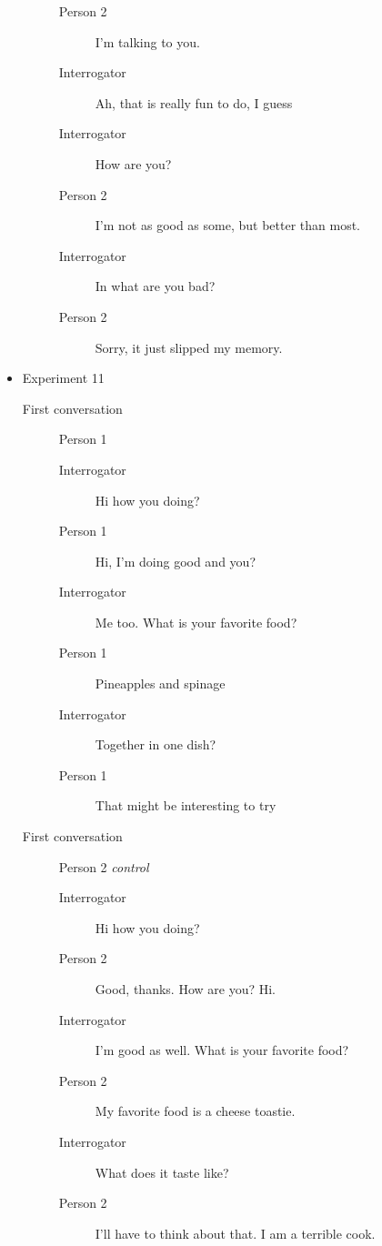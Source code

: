 \begin{itemize}
\begin{description}
\begin{description}
               \item [Person 2] I'm talking to you.
               \item [Interrogator] Ah, that is really fun to do, I guess
               \item [Interrogator] How are you?
               \item [Person 2] I'm not as good as some, but better than most.
               \item [Interrogator] In what are you bad?
               \item [Person 2] Sorry, it just slipped my memory.
            \end{description}
      \end{description}

   \item Experiment 11
      \begin{description}
         \item [First conversation] Person 1
            \begin{description}
               \item [Interrogator] Hi how you doing?
               \item [Person 1] Hi, I'm doing good and you?
               \item [Interrogator] Me too. What is your favorite food?
               \item [Person 1] Pineapples and spinage
               \item [Interrogator] Together in one dish?
               \item [Person 1] That might be interesting to try
            \end{description}
         \item [First conversation] Person 2 \textit{control}
            \begin{description}
               \item [Interrogator] Hi how you doing?
               \item [Person 2] Good, thanks. How are you? Hi.
               \item [Interrogator] I'm good as well. What is your favorite food?
               \item [Person 2] My favorite food is a cheese toastie.
               \item [Interrogator] What does it taste like?
               \item [Person 2] I'll have to think about that. I am a terrible cook.
            \end{description}

\end{description}
\end{itemize}
